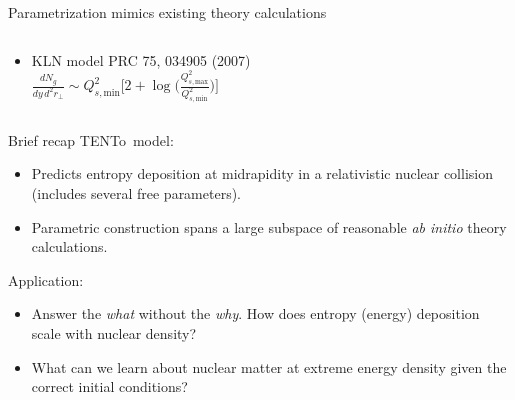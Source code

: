 \documentclass{beamer}
\newcommand{\trento}{T\raisebox{-0.3ex}{R}ENTo}
\begin{document}
\begin{frame}[t]{Parametrization mimics existing theory calculations}
\begin{columns}[T]
\begin{column}{0.6\textwidth}
\begin{itemize}
                      {\scriptsize after brief free streaming phase} \\[1em] 
                      $\displaystyle \frac{dE_T}{dy\,d^2r_\perp}  \sim 
                      \frac{K_\text{sat}}{\pi} p_\text{sat}^3(K_\text{sat}, 
                      \beta; T_A, T_B)$
                \item KLN model \; {\scriptsize \color{theme} PRC 75, 
                     034905 (2007)} \\[1em] $\displaystyle 
                     \frac{dN_g}{dy\,d^2r_\perp} \sim Q^2_{s,\text{min}} \bigg[2 + 
                     \log \bigg(\frac{Q^2_{s,\text{max}}}{Q^2_{s,\text{min}}}
                     \bigg) \bigg]$
            \end{itemize}
        \end{column}
    \end{columns}
\end{frame}

\begin{frame}{Brief recap}{}
  {\color{theme} \trento\ model:}\\
  \begin{itemize}
    \item Predicts entropy deposition at midrapidity in a relativistic nuclear collision (includes several free parameters).
    \item Parametric construction spans a large subspace of reasonable \emph{ab initio} theory calculations.
  \end{itemize}
  \bigskip
  \textcolor{theme}{Application:}\\
  \begin{itemize}
    \item Answer the \emph{what} without the \emph{why}. How does entropy (energy) deposition scale with nuclear density?
    \item What can we learn about nuclear matter at extreme energy density given the correct initial conditions?
  \end{itemize}

\end{frame}
\end{document}
